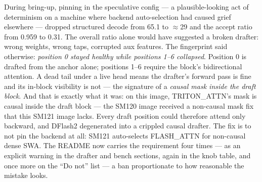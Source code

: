 \begin{hbwarstory}
During bring-up, pinning  in the
speculative config --- a plausible-looking act of determinism on a machine
where backend auto-selection had caused grief elsewhere --- dropped
structured decode from 65.1 to $\approx$29 \tokspersec{} and the accept
ratio from 0.959 to 0.31. The overall ratio alone would have suggested a
broken drafter: wrong weights, wrong taps, corrupted aux features. The
fingerprint said otherwise: \emph{position 0 stayed healthy while positions
1--6 collapsed}. Position 0 is drafted from the anchor alone; positions 1--6
require the block's bidirectional attention. A dead tail under a live head
means the drafter's forward pass is fine and its in-block visibility is not
--- the signature of a \emph{causal mask inside the draft block}. And that
is exactly what it was: on this image, TRITON\_ATTN's mask is causal inside
the draft block --- the SM120 image received a non-causal mask fix that this
SM121 image lacks. Every draft position could therefore attend only
backward, and DFlash2 degenerated into a crippled causal drafter. The fix is to not
pin the backend at all: SM121 auto-selects FLASH\_ATTN for non-causal dense
SWA. The README now carries the requirement four times --- as an explicit
warning in the drafter and bench sections, again in the knob table, and once
more on the ``Do not'' list --- a ban proportionate to how reasonable the
mistake looks.
\end{hbwarstory}

